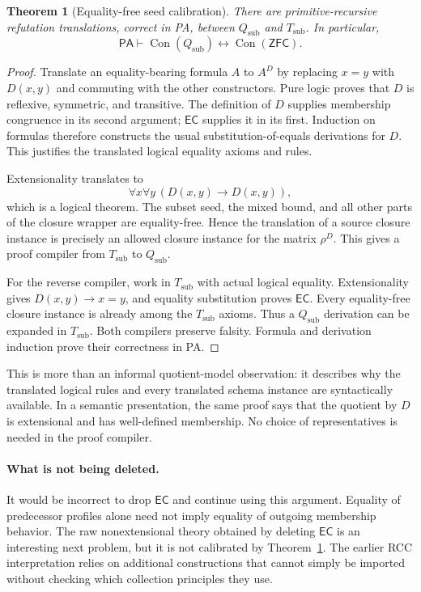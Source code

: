 \documentclass[11pt,letterpaper]{article}
\newtheorem{theorem}{Theorem}[section]
\theoremstyle{definition}\newtheorem{definition}[theorem]{Definition}
\theoremstyle{remark}\newtheorem{remark}[theorem]{Remark}
\newcommand{\PA}{\mathsf{PA}}
\newcommand{\ZFC}{\mathsf{ZFC}}
\newcommand{\Con}{\operatorname{Con}}
\newcommand{\EC}{\mathsf{EC}}
\newcommand{\Tsub}{T_{\mathrm{sub}}}
\newcommand{\QTsub}{Q_{\mathrm{sub}}}
\begin{document}
\begin{theorem}[Equality-free seed calibration]\label{thm:Qsub}
There are primitive-recursive refutation translations, correct in PA,
between $\QTsub$ and $\Tsub$. In particular,
\[
 \PA\vdash\Con(\QTsub)\leftrightarrow\Con(\ZFC).
\]
\end{theorem}
\begin{proof}
Translate an equality-bearing formula $A$ to $A^D$ by replacing
$x=y$ with $D(x,y)$ and commuting with the other constructors.
Pure logic proves that $D$ is reflexive, symmetric, and transitive.
The definition of $D$ supplies membership congruence in its second
argument; $\EC$ supplies it in its first. Induction on formulas therefore
constructs the usual substitution-of-equals derivations for $D$.
This justifies the translated logical equality axioms and rules.

Extensionality translates to
\[
 \forall x\forall y\,(D(x,y)\to D(x,y)),
\]
which is a logical theorem. The subset seed, the mixed bound, and all
other parts of the closure wrapper are equality-free. Hence the
translation of a source closure instance is precisely an allowed
closure instance for the matrix $\rho^D$. This gives a proof compiler
from $\Tsub$ to $\QTsub$.

For the reverse compiler, work in $\Tsub$ with actual logical equality.
Extensionality gives $D(x,y)\to x=y$, and equality substitution proves
$\EC$. Every equality-free closure instance is already among the
$\Tsub$ axioms. Thus a $\QTsub$ derivation can be expanded in $\Tsub$.
Both compilers preserve falsity. Formula and derivation induction prove
their correctness in PA.
\end{proof}

This is more than an informal quotient-model observation: it describes
why the translated logical rules and every translated schema instance
are syntactically available. In a semantic presentation, the same proof
says that the quotient by $D$ is extensional and has well-defined
membership. No choice of representatives is needed in the proof compiler.

\paragraph{What is not being deleted.}
It would be incorrect to drop $\EC$ and continue using this argument.
Equality of predecessor profiles alone need not imply equality of
outgoing membership behavior. The raw nonextensional theory obtained by
deleting $\EC$ is an interesting next problem, but it is not calibrated
by Theorem~\ref{thm:Qsub}. The earlier RCC interpretation relies on
additional constructions that cannot simply be imported without checking
which collection principles they use.
\end{document}

